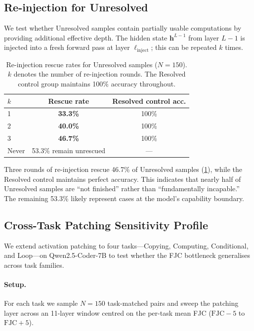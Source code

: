 \subsection{Re-injection for Unresolved}
\label{app:subsec:reinjection_unresolved}

We test whether Unresolved samples contain partially usable computations by providing additional effective depth.
The hidden state $\mathbf{h}^{L-1}$ from layer $L-1$ is injected into a fresh forward pass at layer $\ell_{\mathrm{inject}}$; this can be repeated $k$ times.

\begin{table}[H]
\centering
\caption{Re-injection rescue rates for Unresolved samples ($N=150$). $k$ denotes the number of re-injection rounds. The Resolved control group maintains 100\% accuracy throughout.}
\label{tab:app:reinjection}
\begin{tabular}{lcc}
\toprule
$k$ & Rescue rate & Resolved control acc. \\
\midrule
1     & \textbf{33.3\%} & 100\% \\
2     & \textbf{40.0\%} & 100\% \\
3     & \textbf{46.7\%} & 100\% \\
Never & 53.3\% remain unrescued & --- \\
\bottomrule
\end{tabular}
\end{table}

Three rounds of re-injection rescue 46.7\% of Unresolved samples (\cref{tab:app:reinjection}), while the Resolved control maintains perfect accuracy.
This indicates that nearly half of Unresolved samples are ``not finished'' rather than ``fundamentally incapable.''
The remaining 53.3\% likely represent cases at the model's capability boundary.

\subsection{Cross-Task Patching Sensitivity Profile}
\label{app:subsec:cross_task_patching}

We extend activation patching to four tasks---Copying, Computing, Conditional, and Loop---on Qwen2.5-Coder-7B to test whether the FJC bottleneck generalises across task families.

\paragraph{Setup.}
For each task we sample $N{=}150$ task-matched pairs and sweep the patching layer across an 11-layer window centred on the per-task mean FJC ($\mathrm{FJC}{-}5$ to $\mathrm{FJC}{+}5$).

